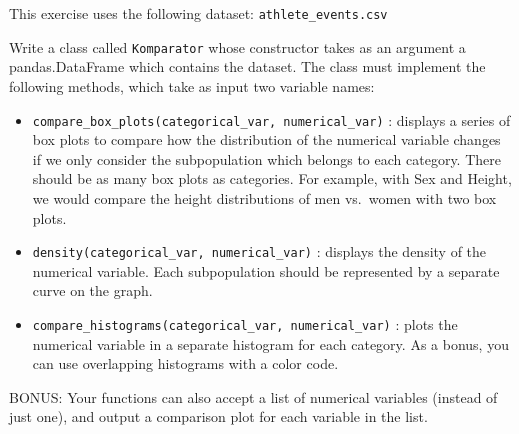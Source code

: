 \documentclass[]{article}
\begin{document}
This exercise uses the following dataset: \texttt{athlete\_events.csv}

Write a class called \texttt{Komparator} whose constructor takes as an
argument a pandas.DataFrame which contains the dataset. The class must
implement the following methods, which take as input two variable names:

\begin{itemize}
\item
  \texttt{compare\_box\_plots(categorical\_var,\ numerical\_var)} :
  displays a series of box plots to compare how the distribution of the
  numerical variable changes if we only consider the subpopulation which
  belongs to each category. There should be as many box plots as
  categories. For example, with Sex and Height, we would compare the
  height distributions of men vs.~women with two box plots.
\item
  \texttt{density(categorical\_var,\ numerical\_var)} : displays the
  density of the numerical variable. Each subpopulation should be
  represented by a separate curve on the graph.
\item
  \texttt{compare\_histograms(categorical\_var,\ numerical\_var)} :
  plots the numerical variable in a separate histogram for each
  category. As a bonus, you can use overlapping histograms with a color
  code.
\end{itemize}

BONUS: Your functions can also accept a list of numerical variables
(instead of just one), and output a comparison plot for each variable in
the list.

\clearpage
\end{document}
